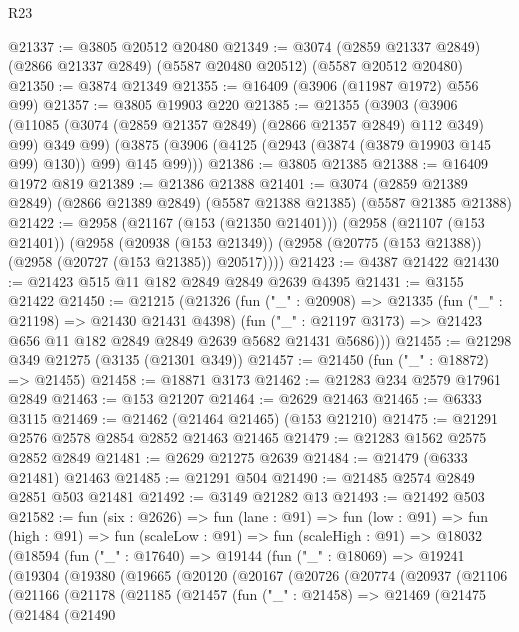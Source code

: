 \begin{lexlean}{R23}
\begin{coremodule}
@21337 := @3805 @20512 @20480
@21349 := @3074
    (@2859 @21337 @2849)
    (@2866 @21337 @2849)
    (@5587 @20480 @20512)
    (@5587 @20512 @20480)
@21350 := @3874 @21349
@21355 := @16409 (@3906 (@11987 @1972) @556 @99)
@21357 := @3805 @19903 @220
@21385 := @21355
    (@3903
      (@3906 (@11085 (@3074 (@2859 @21357 @2849) (@2866 @21357 @2849) @112 @349) @99) @349 @99)
      (@3875 (@3906 (@4125 (@2943 (@3874 (@3879 @19903 @145 @99) @130)) @99) @145 @99)))
@21386 := @3805 @21385
@21388 := @16409 @1972 @819
@21389 := @21386 @21388
@21401 := @3074
    (@2859 @21389 @2849)
    (@2866 @21389 @2849)
    (@5587 @21388 @21385)
    (@5587 @21385 @21388)
@21422 := @2958
    (@21167 (@153 (@21350 @21401)))
    (@2958
      (@21107 (@153 @21401))
      (@2958
        (@20938 (@153 @21349))
        (@2958 (@20775 (@153 @21388)) (@2958 (@20727 (@153 @21385)) @20517))))
@21423 := @4387 @21422
@21430 := @21423 @515 @11 @182 @2849 @2849 @2639 @4395
@21431 := @3155 @21422
@21450 := @21215
    (@21326
      (fun ("_" : @20908) =>
      @21335
        (fun ("_" : @21198) => @21430 @21431 @4398)
        (fun ("_" : @21197 @3173) => @21423 @656 @11 @182 @2849 @2849 @2639 @5682 @21431 @5686)))
@21455 := @21298 @349 @21275 (@3135 (@21301 @349))
@21457 := @21450 (fun ("_" : @18872) => @21455)
@21458 := @18871 @3173
@21462 := @21283 @234 @2579 @17961 @2849
@21463 := @153 @21207
@21464 := @2629 @21463
@21465 := @6333 @3115
@21469 := @21462 (@21464 @21465) (@153 @21210)
@21475 := @21291 @2576 @2578 @2854 @2852 @21463 @21465
@21479 := @21283 @1562 @2575 @2852 @2849
@21481 := @2629 @21275 @2639
@21484 := @21479 (@6333 @21481) @21463
@21485 := @21291 @504
@21490 := @21485 @2574 @2849 @2851 @503 @21481
@21492 := @3149 @21282 @13
@21493 := @21492 @503
@21582 := fun (six : @2626) =>
  fun (lane : @91) =>
  fun (low : @91) =>
  fun (high : @91) =>
  fun (scaleLow : @91) =>
  fun (scaleHigh : @91) =>
  @18032
    (@18594
      (fun ("_" : @17640) =>
      @19144
        (fun ("_" : @18069) =>
        @19241
          (@19304
            (@19380
              (@19665
                (@20120
                  (@20167
                    (@20726
                      (@20774
                        (@20937
                          (@21106
                            (@21166
                              (@21178
                                (@21185
                                  (@21457
                                    (fun ("_" : @21458) =>
                                    @21469
                                      (@21475
                                        (@21484
                                          (@21490

\end{coremodule}
\end{lexlean}
